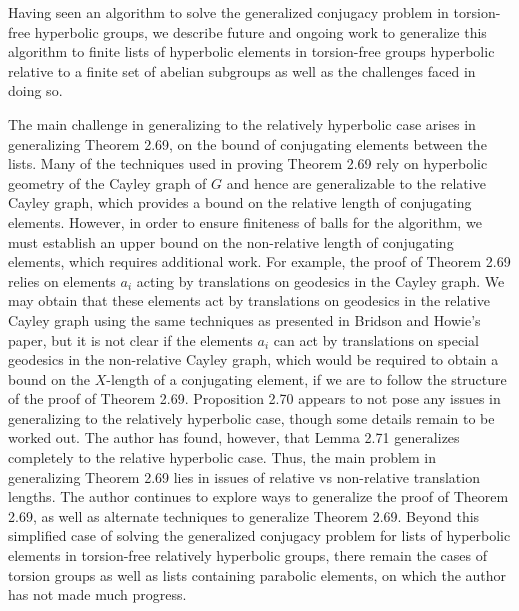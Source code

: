 \documentclass[12pt]{article}
\newcommand{\vs}{\vskip10pt}
\begin{document}
	\vs 
	
	Having seen an algorithm to solve the generalized conjugacy problem in torsion-free hyperbolic groups, we describe future and ongoing work to generalize this algorithm to finite lists of hyperbolic elements in torsion-free groups hyperbolic relative to a finite set of abelian subgroups as well as the challenges faced in doing so. 
	
	\vs 
	
	The main challenge in generalizing to the relatively hyperbolic case arises in generalizing Theorem 2.69, on the bound of conjugating elements between the lists. Many of the techniques used in proving Theorem 2.69 rely on hyperbolic geometry of the Cayley graph of $G$ and hence are generalizable to the relative Cayley graph, which provides a bound on the relative length of conjugating elements. However, in order to ensure finiteness of balls for the algorithm, we must establish an upper bound on the non-relative length of conjugating elements, which requires additional work. For example, the proof of Theorem 2.69 relies on elements $a_i$ acting by translations on geodesics in the Cayley graph. We may obtain that these elements act by translations on geodesics in the relative Cayley graph using the same techniques as presented in Bridson and Howie's paper, but it is not clear if the elements $a_i$ can act by translations on special geodesics in the non-relative Cayley graph, which would be required to obtain a bound on the $X$-length of a conjugating element, if we are to follow the structure of the proof of Theorem 2.69. Proposition 2.70 appears to not pose any issues in generalizing to the relatively hyperbolic case, though some details remain to be worked out. The author has found, however, that Lemma 2.71 generalizes completely to the relative hyperbolic case. Thus, the main problem in generalizing Theorem 2.69 lies in issues of relative vs non-relative translation lengths. The author continues to explore ways to generalize the proof of Theorem 2.69, as well as alternate techniques to generalize Theorem 2.69. Beyond this simplified case of solving the generalized conjugacy problem for lists of hyperbolic elements in torsion-free relatively hyperbolic groups, there remain the cases of torsion groups as well as lists containing parabolic elements, on which the author has not made much progress. 
	
	\vs 
	
\end{document}

